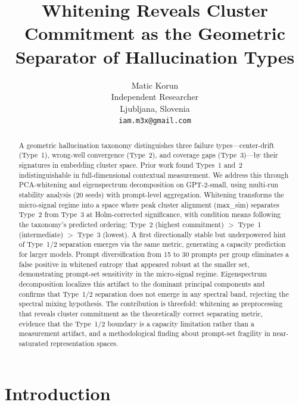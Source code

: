 \documentclass[11pt]{article}
\title{Whitening Reveals Cluster Commitment as the Geometric Separator of Hallucination Types}
\author{
  Matic Korun \\
  Independent Researcher \\
  Ljubljana, Slovenia \\
  \texttt{iam.m3x@gmail.com}
}
\begin{document}
\maketitle


\begin{abstract}
A geometric hallucination taxonomy distinguishes three failure types---center-drift (Type~1), wrong-well convergence (Type~2), and coverage gaps (Type~3)---by their signatures in embedding cluster space. Prior work found Types~1 and~2 indistinguishable in full-dimensional contextual measurement. We address this through PCA-whitening and eigenspectrum decomposition on GPT-2-small, using multi-run stability analysis (20 seeds) with prompt-level aggregation. Whitening transforms the micro-signal regime into a space where peak cluster alignment (max\_sim) separates Type~2 from Type~3 at Holm-corrected significance, with condition means following the taxonomy's predicted ordering: Type~2 (highest commitment) $>$ Type~1 (intermediate) $>$ Type~3 (lowest). A first directionally stable but underpowered hint of Type~1/2 separation emerges via the same metric, generating a capacity prediction for larger models. Prompt diversification from 15 to 30 prompts per group eliminates a false positive in whitened entropy that appeared robust at the smaller set, demonstrating prompt-set sensitivity in the micro-signal regime. Eigenspectrum decomposition localizes this artifact to the dominant principal components and confirms that Type~1/2 separation does not emerge in any spectral band, rejecting the spectral mixing hypothesis. The contribution is threefold: whitening as preprocessing that reveals cluster commitment as the theoretically correct separating metric, evidence that the Type~1/2 boundary is a capacity limitation rather than a measurement artifact, and a methodological finding about prompt-set fragility in near-saturated representation spaces.
\end{abstract}


\section{Introduction}
\end{document}
